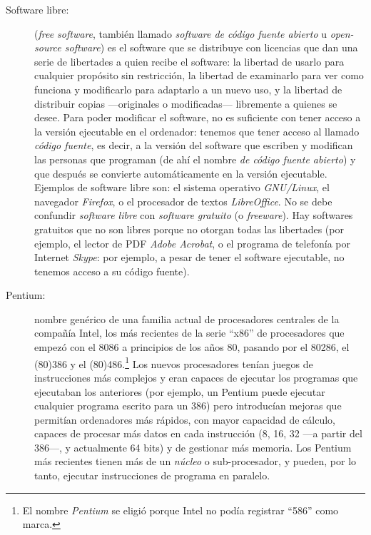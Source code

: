 \begin{description}
\item[Software libre:] (\emph{free software}, también llamado \emph{software de código fuente abierto} u \emph{open-source software}) es el software que se distribuye con licencias que dan una serie de libertades a quien recibe el software: la libertad de usarlo para cualquier propósito sin restricción, la libertad de examinarlo para ver como funciona y modificarlo para adaptarlo a un nuevo uso, y la libertad de distribuir copias ---originales o modificadas--- libremente a quienes se desee. Para poder modificar el software, no es suficiente con tener acceso a la versión ejecutable en el ordenador: tenemos que tener acceso al llamado \emph{código fuente}, es decir, a la versión del software que escriben y modifican las personas que programan (de ahí el nombre \emph{de código fuente abierto}) y que después se convierte automáticamente en la versión ejecutable. Ejemplos de software libre son: el sistema operativo \emph{GNU/Linux}, el navegador \emph{Firefox}, o el procesador de textos \emph{LibreOffice}. No se debe confundir \emph{software libre} con \emph{software gratuito} (o \emph{freeware}). Hay softwares gratuitos que no son libres porque no otorgan todas las libertades (por ejemplo, el lector de PDF \emph{Adobe Acrobat}, o el programa de telefonía por Internet \emph{Skype}: por ejemplo, a pesar de tener el software ejecutable, no tenemos acceso a su código fuente). 

\item[Pentium:] nombre genérico de una familia actual de procesadores centrales de la compañía Intel, los más recientes de la serie ``x86'' de procesadores que empezó con el 8086 a principios de los años 80, pasando por el 80286, el (80)386 y el (80)486.\footnote{El nombre \emph{Pentium} se eligió porque Intel no podía registrar ``586'' como marca.} Los nuevos procesadores tenían juegos de instrucciones más complejos y eran capaces de ejecutar los programas que ejecutaban los anteriores (por ejemplo, un Pentium puede ejecutar cualquier programa escrito para un 386) pero introducían mejoras que permitían ordenadores más rápidos, con mayor capacidad de cálculo, capaces de procesar más datos en cada instrucción (8, 16, 32 ---a partir del 386---, y actualmente 64 bits) y de gestionar más memoria. Los Pentium más recientes tienen más de un \emph{núcleo} o sub-procesador, y pueden, por lo tanto, ejecutar instrucciones de programa en paralelo. 


\end{description}
